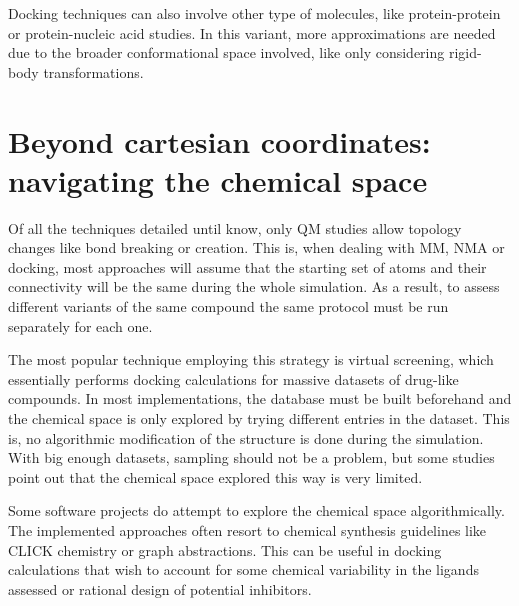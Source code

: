 Docking techniques can also involve other type of molecules, like protein-protein or protein-nucleic acid studies. In this variant, more approximations are needed due to the broader conformational space involved, like only considering rigid-body transformations.

\section[Beyond cartesian coordinates: navigating the chemical space]{Beyond cartesian coordinates: \\navigating the chemical space}

Of all the techniques detailed until know, only QM studies allow topology changes like bond breaking or creation. This is, when dealing with MM, NMA or docking, most approaches will assume that the starting set of atoms and their connectivity will be the same during the whole simulation. As a result, to assess different variants of the same compound the same protocol must be run separately for each one.

The most popular technique employing this strategy is virtual screening, which essentially performs docking calculations for massive datasets of drug-like compounds. In most implementations, the database must be built beforehand and the chemical space is only explored by trying different entries in the dataset. This is, no algorithmic modification of the structure is done during the simulation. With big enough datasets, sampling should not be a problem, but some studies point out that the chemical space explored this way is very limited.\cite{virshup2013stochastic}

Some software projects do attempt to explore the chemical space algorithmically.\cite{oprea2001chemography,bon2010bioactivity,larsson2007chemgps,Goodnow_2016,Reymond_2015,Chari_2015,Maggiora_2014,Naveja_2017} The implemented approaches often resort to chemical synthesis guidelines like CLICK chemistry\cite{durrant2009} or graph abstractions.\cite{andersen2014} This can be useful in docking calculations that wish to account for some chemical variability in the ligands assessed or rational design of potential inhibitors.

